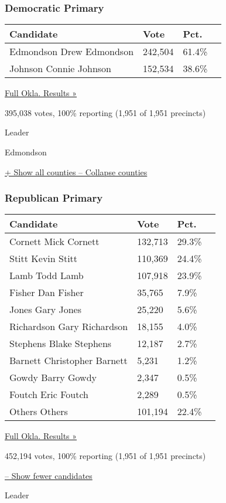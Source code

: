 \hypertarget{democratic-primary}{%
\subsubsection{Democratic Primary}\label{democratic-primary}}

\begin{longtable}[]{@{}llll@{}}
\toprule
Candidate & Vote & Pct. &\tabularnewline
\midrule
\endhead
 Edmondson Drew Edmondson & 242,504 & 61.4\% &\tabularnewline
 Johnson Connie Johnson & 152,534 & 38.6\% &\tabularnewline
\bottomrule
\end{longtable}

\href{https://www.nytimes3xbfgragh.onion/elections/results/oklahoma}{Full
Okla. Results »}

395,038 votes, 100\% reporting (1,951 of 1,951 precincts)

Leader

 Edmondson

\protect\hyperlink{}{+ Show all counties -- Collapse counties}

\hypertarget{republican-primary}{%
\subsubsection{Republican Primary}\label{republican-primary}}

\begin{longtable}[]{@{}llll@{}}
\toprule
Candidate & Vote & Pct. &\tabularnewline
\midrule
\endhead
 Cornett Mick Cornett & 132,713 & 29.3\% &\tabularnewline
 Stitt Kevin Stitt & 110,369 & 24.4\% &\tabularnewline
 Lamb Todd Lamb & 107,918 & 23.9\% &\tabularnewline
 Fisher Dan Fisher & 35,765 & 7.9\% &\tabularnewline
 Jones Gary Jones & 25,220 & 5.6\% &\tabularnewline
 Richardson Gary Richardson & 18,155 & 4.0\% &\tabularnewline
 Stephens Blake Stephens & 12,187 & 2.7\% &\tabularnewline
 Barnett Christopher Barnett & 5,231 & 1.2\% &\tabularnewline
 Gowdy Barry Gowdy & 2,347 & 0.5\% &\tabularnewline
 Foutch Eric Foutch & 2,289 & 0.5\% &\tabularnewline
 Others Others & 101,194 & 22.4\% &\tabularnewline
\bottomrule
\end{longtable}

\href{https://www.nytimes3xbfgragh.onion/elections/results/oklahoma}{Full
Okla. Results »}

452,194 votes, 100\% reporting (1,951 of 1,951 precincts)

\protect\hyperlink{}{-- Show fewer candidates}

Leader

